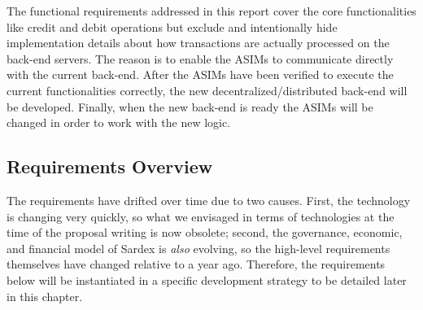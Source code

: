The functional requirements addressed in this report cover the core functionalities like credit and debit operations but exclude and intentionally hide implementation details about how transactions are actually processed on the back-end servers. The reason is to enable the ASIMs to communicate directly with the current back-end. After the ASIMs have been verified to execute the current functionalities correctly, the new decentralized/distributed back-end will be developed. Finally, when the new back-end is ready the ASIMs will be changed in order to work with the new logic.

\subsection{Requirements Overview}\label{_requirements_overview}
The requirements have drifted over time due to two causes. First, the technology is changing very quickly, so what we envisaged in terms of technologies at the time of the proposal writing is now obsolete; second, the governance, economic, and financial model of Sardex is \emph{also} evolving, so the high-level requirements themselves have changed relative to a year ago. Therefore, the requirements below will be instantiated in a specific development strategy to be detailed later in this chapter.
\setcounter{table}{0}
\setlength{\tabcolsep}{10pt}

